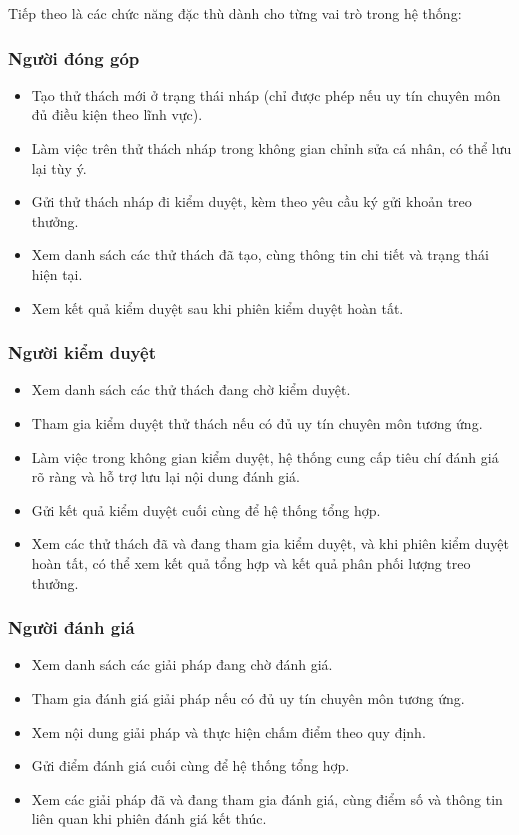 Tiếp theo là các chức năng đặc thù dành cho từng vai trò trong hệ thống:

\subsubsection{Người đóng góp}

\begin{itemize}
  \item Tạo thử thách mới ở trạng thái nháp (chỉ được phép nếu uy tín chuyên môn đủ điều kiện theo lĩnh vực).
  \item Làm việc trên thử thách nháp trong không gian chỉnh sửa cá nhân, có thể lưu lại tùy ý.
  \item Gửi thử thách nháp đi kiểm duyệt, kèm theo yêu cầu ký gửi khoản treo thưởng.
  \item Xem danh sách các thử thách đã tạo, cùng thông tin chi tiết và trạng thái hiện tại.
  \item Xem kết quả kiểm duyệt sau khi phiên kiểm duyệt hoàn tất.
\end{itemize}

\subsubsection{Người kiểm duyệt}

\begin{itemize}
  \item Xem danh sách các thử thách đang chờ kiểm duyệt.
  \item Tham gia kiểm duyệt thử thách nếu có đủ uy tín chuyên môn tương ứng.
  \item Làm việc trong không gian kiểm duyệt, hệ thống cung cấp tiêu chí đánh giá rõ ràng và hỗ trợ lưu lại nội dung đánh giá.
  \item Gửi kết quả kiểm duyệt cuối cùng để hệ thống tổng hợp.
  \item Xem các thử thách đã và đang tham gia kiểm duyệt, và khi phiên kiểm duyệt hoàn tất, có thể xem kết quả tổng hợp và kết quả phân phối lượng treo thưởng.
\end{itemize}

\subsubsection{Người đánh giá}

\begin{itemize}
  \item Xem danh sách các giải pháp đang chờ đánh giá.
  \item Tham gia đánh giá giải pháp nếu có đủ uy tín chuyên môn tương ứng.
  \item Xem nội dung giải pháp và thực hiện chấm điểm theo quy định.
  \item Gửi điểm đánh giá cuối cùng để hệ thống tổng hợp.
  \item Xem các giải pháp đã và đang tham gia đánh giá, cùng điểm số và thông tin liên quan khi phiên đánh giá kết thúc.
\end{itemize}

